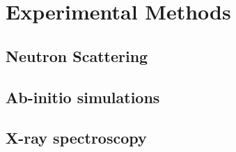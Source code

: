 \chapter{Experimental Methods}
\section{Neutron Scattering}
\section{Ab-initio simulations}
\section{X-ray spectroscopy}